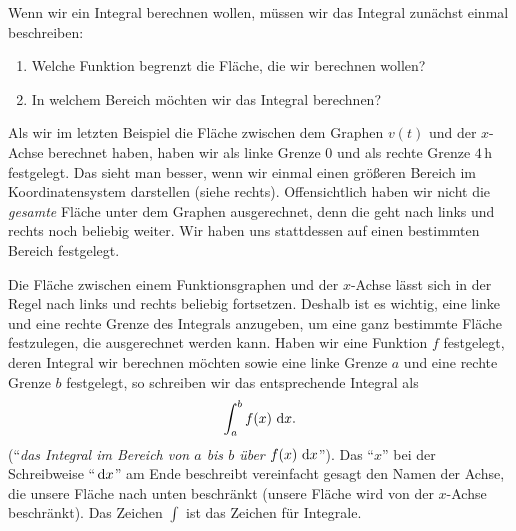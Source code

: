 \documentclass[../../main.tex]{subfiles}
\begin{document}
Wenn wir ein Integral berechnen wollen, müssen wir das Integral zunächst einmal beschreiben:
\begin{enumerate}
    \item Welche Funktion begrenzt die Fläche, die wir berechnen wollen?
    \item In welchem Bereich möchten wir das Integral berechnen?
\end{enumerate}
\begin{example}{}
    Als wir im letzten Beispiel die Fläche zwischen dem Graphen $v(t)$ und der $x$-Achse berechnet haben, haben wir
    als linke Grenze $0$ und als rechte Grenze $4\,\text{h}$ festgelegt. Das sieht man besser, wenn wir einmal einen 
    größeren Bereich im Koordinatensystem darstellen (siehe rechts). Offensichtlich haben wir nicht die \emph{gesamte} 
    Fläche unter dem Graphen ausgerechnet, denn die geht nach links und rechts noch beliebig weiter. Wir haben uns
    stattdessen auf einen bestimmten Bereich festgelegt.
\end{example}
Die Fläche zwischen einem Funktionsgraphen und der $x$-Achse lässt sich in der Regel nach links und rechts beliebig
fortsetzen. Deshalb ist es wichtig, eine linke und eine rechte Grenze des Integrals anzugeben, um eine ganz bestimmte
Fläche festzulegen, die ausgerechnet werden kann. Haben wir eine Funktion $f$ festgelegt, deren Integral wir berechnen
möchten sowie eine linke Grenze $a$ und eine rechte Grenze $b$ festgelegt, so schreiben wir das entsprechende Integral 
als
\[\int_a^bf(x)\mathop{}\mathrm{d} x.\]
(\enquote{\emph{das Integral im Bereich von $a$ bis $b$ über $f(x)\mathop{}\mathrm{d} x$}}). Das \enquote{$x$} bei der Schreibweise 
\enquote{$\mathop{}\mathrm{d} x$} am Ende beschreibt vereinfacht gesagt den Namen 
der Achse, die unsere Fläche nach unten beschränkt (unsere Fläche wird von der $x$-Achse beschränkt). Das Zeichen $\int$
ist das Zeichen für Integrale.
\end{document}
